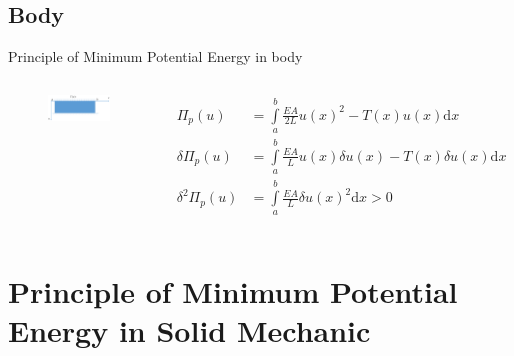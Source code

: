 \documentclass[11pt]{beamer}
\begin{document}
\subsection{Body}
\begin{frame}{Principle of Minimum Potential Energy in body}
\begin{columns}
\begin{figure}
\centering
\includegraphics[width=1\linewidth]{source/continuous_elastc_body}
\end{figure}
\begin{block}{}
\begin{align*}
\Pi_p(u)&=  \int\limits_{a}^{b}\frac{EA}{2L}u(x)^2-T(x)u(x)\mathrm{d}x\\
\delta\Pi_p(u)&= \int\limits_{a}^{b}\frac{EA}{L}u(x)\delta u(x)-T(x)\delta u(x)\mathrm{d}x\\
\delta^2\Pi_p(u)&= \int\limits_{a}^{b}\frac{EA}{L}\delta u(x)^2\mathrm{d}x>0
\end{align*}
\end{block}
\end{columns}
\end{frame}

\section{Principle of Minimum Potential Energy in Solid Mechanic}
\end{document}
